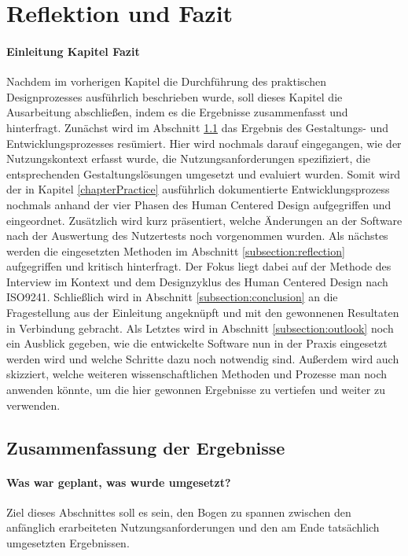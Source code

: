 \chapter{Reflektion und Fazit}
\subsubsection{Einleitung Kapitel Fazit}

Nachdem im vorherigen Kapitel die Durchführung des praktischen Designprozesses
ausführlich beschrieben wurde, soll dieses Kapitel die Ausarbeitung
abschließen, indem es die Ergebnisse zusammenfasst und hinterfragt. Zunächst
wird im Abschnitt \ref{subsection:resultDescription} das Ergebnis des
Gestaltungs- und Entwicklungsprozesses resümiert. Hier wird nochmals darauf
eingegangen, wie der Nutzungskontext erfasst wurde, die Nutzungsanforderungen
spezifiziert, die entsprechenden Gestaltungslösungen umgesetzt und evaluiert
wurden. Somit wird der in Kapitel \ref{chapterPractice} ausführlich
dokumentierte Entwicklungsprozess nochmals anhand der vier Phasen des Human
Centered Design aufgegriffen und eingeordnet\cite{iso9241}. Zusätzlich wird
kurz präsentiert, welche Änderungen an der Software nach der Auswertung des
Nutzertests noch vorgenommen wurden. Als nächstes werden die eingesetzten
Methoden im Abschnitt \ref{subsection:reflection} aufgegriffen und kritisch
hinterfragt. Der Fokus liegt dabei auf der Methode des Interview im Kontext und
dem Designzyklus des Human Centered Design nach ISO9241. Schließlich wird in
Abschnitt \ref{subsection:conclusion} an die Fragestellung aus der Einleitung
angeknüpft und mit den gewonnenen Resultaten in Verbindung gebracht. Als
Letztes wird in Abschnitt \ref{subsection:outlook} noch ein Ausblick gegeben,
wie die entwickelte Software nun in der Praxis eingesetzt werden wird und
welche Schritte dazu noch notwendig sind. Außerdem wird auch skizziert, welche
weiteren wissenschaftlichen Methoden und Prozesse man noch anwenden könnte, um
die hier gewonnen Ergebnisse zu vertiefen und weiter zu verwenden.

\section{Zusammenfassung der Ergebnisse}
\label{subsection:resultDescription}

\subsubsection{Was war geplant, was wurde umgesetzt?}
Ziel dieses Abschnittes soll es sein, den Bogen zu spannen zwischen den
anfänglich erarbeiteten Nutzungsanforderungen und den am Ende tatsächlich
umgesetzten Ergebnissen.

